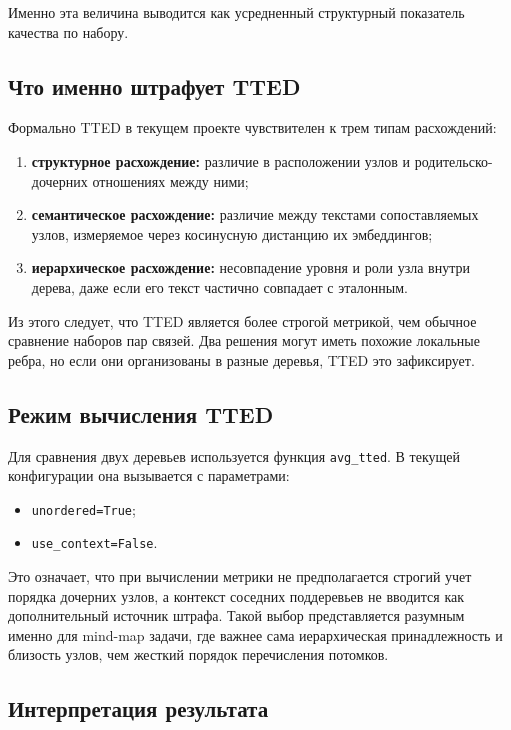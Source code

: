 \documentclass[12pt,a4paper]{article}
\begin{document}
Именно эта величина выводится как усредненный структурный показатель качества по набору.

\subsection{Что именно штрафует TTED}

Формально TTED в текущем проекте чувствителен к трем типам расхождений:

\begin{enumerate}
    \item \textbf{структурное расхождение:} различие в расположении узлов и родительско-
    дочерних отношениях между ними;
    \item \textbf{семантическое расхождение:} различие между текстами сопоставляемых узлов,
    измеряемое через косинусную дистанцию их эмбеддингов;
    \item \textbf{иерархическое расхождение:} несовпадение уровня и роли узла внутри
    дерева, даже если его текст частично совпадает с эталонным.
\end{enumerate}

Из этого следует, что TTED является более строгой метрикой, чем обычное сравнение
наборов пар связей. Два решения могут иметь похожие локальные ребра, но если они
организованы в разные деревья, TTED это зафиксирует.

\subsection{Режим вычисления TTED}

Для сравнения двух деревьев используется функция \texttt{avg\_tted}. В текущей
конфигурации она вызывается с параметрами:

\begin{itemize}
    \item \texttt{unordered=True};
    \item \texttt{use\_context=False}.
\end{itemize}

Это означает, что при вычислении метрики не предполагается строгий учет порядка дочерних
узлов, а контекст соседних поддеревьев не вводится как дополнительный источник штрафа.
Такой выбор представляется разумным именно для mind-map задачи, где важнее сама
иерархическая принадлежность и близость узлов, чем жесткий порядок перечисления потомков.

\subsection{Интерпретация результата}
\end{document}
